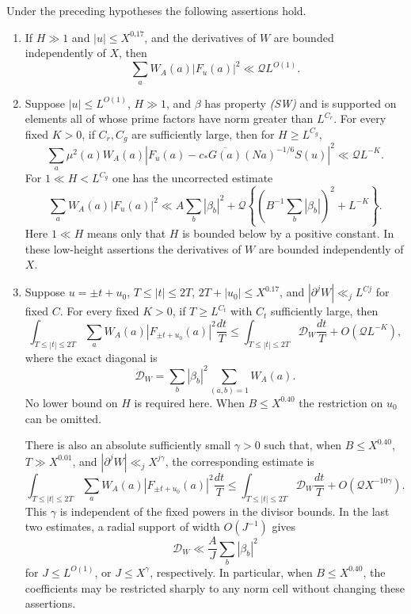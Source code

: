 \begin{proposition}
\label{prop:dispersion}
Under the preceding hypotheses the following assertions hold.
\begin{enumerate}
\item If $H\gg1$ and $|u|\le X^{0.17}$, and the derivatives of $W$ are
bounded independently of $X$, then
\[
 \sum_a W_A(a)|F_u(a)|^2\ll \mathcal Q L^{O(1)}.
\]
\item Suppose $|u|\le L^{O(1)}$, $H\gg1$, and $\beta$ has property
\emph{(SW)} and is supported on elements all of whose prime factors have
norm greater than $L^{C_r}$. For every fixed $K>0$, if $C_r,C_g$ are
sufficiently large, then for $H\ge L^{C_g}$,
\begin{equation}
 \sum_a\mu^2(a)W_A(a)
 \left|F_u(a)-c_*\overline{G(a)}(Na)^{-1/6}S(u)\right|^2
 \ll \mathcal Q L^{-K}.
 \label{eq:dispersion-corrected}
\end{equation}
For $1\ll H<L^{C_g}$ one has the uncorrected estimate
\begin{equation}
 \sum_a W_A(a)|F_u(a)|^2
 \ll A\sum_b|\beta_b|^2+
 \mathcal Q\left\{\left(B^{-1}\sum_b|\beta_b|\right)^2+L^{-K}\right\}.
 \label{eq:dispersion-short}
\end{equation}
Here $1\ll H$ means only that $H$ is bounded below by a positive
constant. In these low-height assertions the derivatives of $W$ are
bounded independently of $X$.
\item Suppose $u=\pm t+u_0$, $T\le |t|\le2T$,
$2T+|u_0|\le X^{0.17}$, and
$|\partial^jW|\ll_j L^{Cj}$ for fixed $C$. For every fixed $K>0$, if
$T\ge L^{C_t}$ with $C_t$ sufficiently large, then
\begin{equation}
 \int_{T\le|t|\le2T}\sum_a W_A(a)|F_{\pm t+u_0}(a)|^2\frac{dt}{T}
 \le \int_{T\le|t|\le2T}\mathcal D_W\frac{dt}{T}
       +O(\mathcal Q L^{-K}),
 \label{eq:dispersion-height}
\end{equation}
where the exact diagonal is
\[
 \mathcal D_W=\sum_b|\beta_b|^2
                  \sum_{(a,b)=1}W_A(a).
\]
No lower bound on $H$ is required here. When $B\le X^{0.40}$ the
restriction on $u_0$ can be omitted.

There is also an absolute sufficiently small $\gamma>0$ such that, when
$B\le X^{0.40}$, $T\gg X^{0.01}$, and
$|\partial^jW|\ll_j X^{j\gamma}$, the corresponding estimate is
\begin{equation}
 \int_{T\le|t|\le2T}\sum_a W_A(a)|F_{\pm t+u_0}(a)|^2\frac{dt}{T}
 \le \int_{T\le|t|\le2T}\mathcal D_W\frac{dt}{T}
       +O(\mathcal Q X^{-10\gamma}).
 \label{eq:dispersion-power}
\end{equation}
This $\gamma$ is independent of the fixed powers in the divisor bounds.
In the last two estimates, a radial support of width $O(J^{-1})$ gives
\[
 \mathcal D_W\ll \frac AJ\sum_b|\beta_b|^2
\]
for $J\le L^{O(1)}$, or $J\le X^\gamma$, respectively. In particular,
when $B\le X^{0.40}$, the coefficients may be restricted sharply to any
norm cell without changing these assertions.
\end{enumerate}
\end{proposition}

